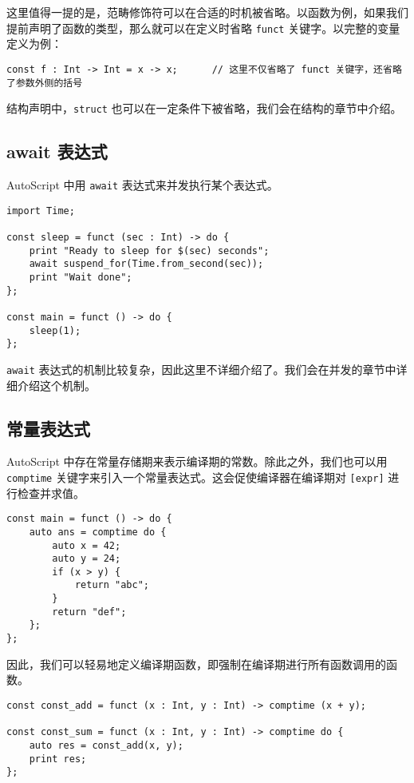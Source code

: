 这里值得一提的是，范畴修饰符可以在合适的时机被省略。以函数为例，如果我们提前声明了函数的类型，那么就可以在定义时省略 \lstinline!funct! 关键字。以完整的变量定义为例：

\begin{lstlisting}
const f : Int -> Int = x -> x;		// 这里不仅省略了 funct 关键字，还省略了参数外侧的括号
\end{lstlisting}

结构声明中，\lstinline!struct! 也可以在一定条件下被省略，我们会在结构的章节中介绍。

\subsection{await 表达式}

AutoScript 中用 \lstinline!await! 表达式来并发执行某个表达式。

\begin{lstlisting}
import Time;

const sleep = funct (sec : Int) -> do {
    print "Ready to sleep for $(sec) seconds";
    await suspend_for(Time.from_second(sec));
    print "Wait done";
};

const main = funct () -> do {
    sleep(1);
};
\end{lstlisting}

\lstinline!await! 表达式的机制比较复杂，因此这里不详细介绍了。我们会在并发的章节中详细介绍这个机制。

\subsection{常量表达式}

AutoScript 中存在常量存储期来表示编译期的常数。除此之外，我们也可以用 \lstinline!comptime! 关键字来引入一个常量表达式。这会促使编译器在编译期对 \texttt{[expr]} 进行检查并求值。

\begin{lstlisting}
const main = funct () -> do {
    auto ans = comptime do {
        auto x = 42;
        auto y = 24;
        if (x > y) {
            return "abc";
        }
        return "def";
    };
};
\end{lstlisting}

因此，我们可以轻易地定义编译期函数，即强制在编译期进行所有函数调用的函数。

\begin{lstlisting}
const const_add = funct (x : Int, y : Int) -> comptime (x + y);

const const_sum = funct (x : Int, y : Int) -> comptime do {
    auto res = const_add(x, y);
    print res;
};
\end{lstlisting}

